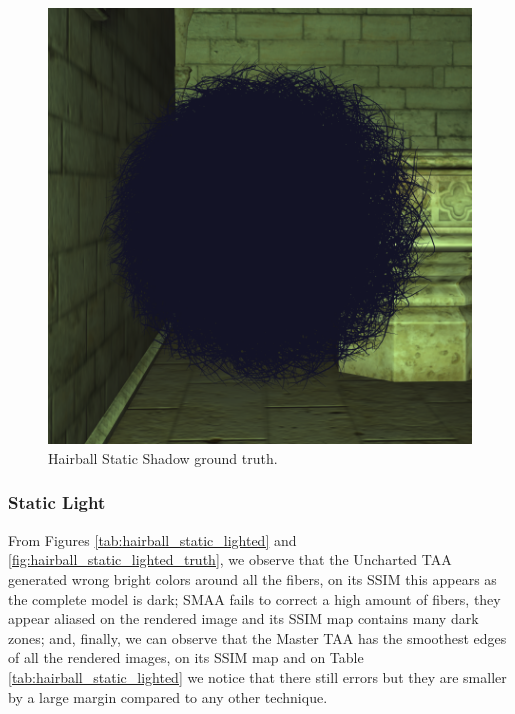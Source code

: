 \documentclass[pregrado]{tesis-usb} %
\begin{document}
\begin{figure}[H]
	\centering
	\includegraphics[scale=0.3]{images/results/hairball_sobel_ground_truth.png}
	\caption{Hairball Static Shadow ground truth.}\label{fig:hairball_static_shadow_truth}
\end{figure}


\subsubsection{Static Light}
From Figures \ref{tab:hairball_static_lighted} and \ref{fig:hairball_static_lighted_truth}, we observe that the Uncharted TAA generated wrong bright colors around all the fibers, on its SSIM this appears as the complete model is dark; SMAA fails to correct a high amount of fibers, they appear aliased on the rendered image and its SSIM map contains many dark zones; and, finally, we can observe that the Master TAA has the smoothest edges of all the rendered images, on its SSIM map and on Table \ref{tab:hairball_static_lighted} we notice that there still errors but they are smaller by a large margin compared to any other technique.
\end{document}
